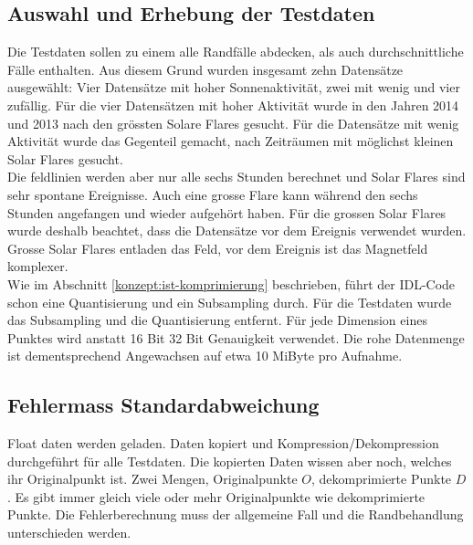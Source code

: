 \subsection{Auswahl und Erhebung der Testdaten}\label{testsetup:auswahl_erhebung}
Die Testdaten sollen zu einem alle Randfälle abdecken, als auch durchschnittliche Fälle enthalten. Aus diesem Grund wurden insgesamt zehn Datensätze ausgewählt: Vier Datensätze mit hoher Sonnenaktivität, zwei mit wenig und vier zufällig. Für die vier Datensätzen mit hoher Aktivität wurde in den Jahren 2014 und 2013 nach den grössten Solare Flares gesucht. Für die Datensätze mit wenig Aktivität wurde das Gegenteil gemacht, nach Zeiträumen mit möglichst kleinen Solar Flares gesucht.\\
Die feldlinien werden aber nur alle sechs Stunden berechnet und Solar Flares sind sehr spontane Ereignisse. Auch eine grosse Flare kann während den sechs Stunden angefangen und wieder aufgehört haben. Für die grossen Solar Flares wurde deshalb beachtet, dass die Datensätze vor dem Ereignis verwendet wurden. Grosse Solar Flares entladen das Feld, vor dem Ereignis ist das Magnetfeld komplexer.\\
[\baselineskip]
Wie im Abschnitt \ref{konzept:ist-komprimierung} beschrieben, führt der IDL-Code schon eine Quantisierung und ein Subsampling durch. Für die Testdaten wurde das Subsampling und die Quantisierung entfernt. Für jede Dimension eines Punktes wird anstatt 16 Bit 32 Bit Genauigkeit verwendet. Die rohe Datenmenge ist dementsprechend Angewachsen auf etwa 10 MiByte pro Aufnahme.

\subsection{Fehlermass Standardabweichung}\label{testsetup:ablauf}
Float daten werden geladen. Daten kopiert und Kompression/Dekompression durchgeführt für alle Testdaten. Die kopierten Daten wissen aber noch, welches ihr Originalpunkt ist.
Zwei Mengen, Originalpunkte $O$, dekomprimierte Punkte $D$. Es gibt immer gleich viele oder mehr Originalpunkte wie dekomprimierte Punkte. Die Fehlerberechnung muss der allgemeine Fall und die Randbehandlung unterschieden werden.

